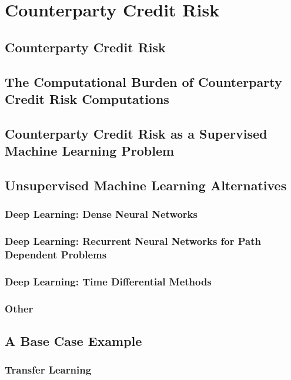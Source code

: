 \chapter{Counterparty Credit Risk}
\label{chap:CounterpartyRisk}

\section{Counterparty Credit Risk}

\section{The Computational Burden of Counterparty Credit Risk Computations}

\section{Counterparty Credit Risk as a Supervised Machine Learning Problem}


\section{Unsupervised Machine Learning Alternatives}
\subsection{Deep Learning: Dense Neural Networks}
\subsection{Deep Learning: Recurrent Neural Networks for Path Dependent Problems}
\subsection{Deep Learning: Time Differential Methods}
\subsection{Other}
\section{A Base Case Example}
\subsection{Transfer Learning}
